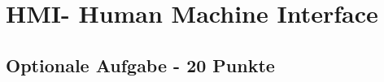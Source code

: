 \section{HMI- Human Machine Interface} \label{cpt:HMI}

\subsection{Optionale Aufgabe - 20 Punkte}


